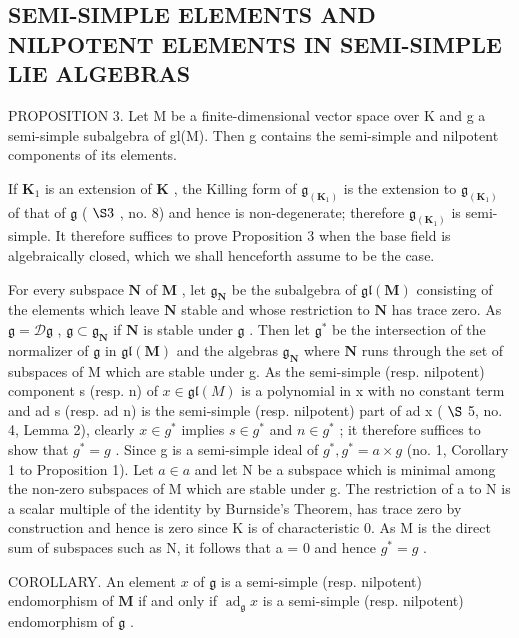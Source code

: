 \subsection{SEMI-SIMPLE ELEMENTS AND NILPOTENT ELEMENTS IN SEMI-SIMPLE LIE ALGEBRAS}

PROPOSITION 3. Let M be a finite-dimensional vector space over K and g a semi-simple subalgebra of gl(M). Then g contains the semi-simple and nilpotent components of its elements.

If \(\mathbf{K}_1\) is an extension of \(\mathbf{K}\) , the Killing form of \(\mathfrak{g}_{(\mathbf{K}_1)}\) is the extension to \(\mathfrak{g}_{(\mathbf{K}_1)}\) of that of \(\mathfrak{g}\) ( \(\S 3\) , no. 8) and hence is non-degenerate; therefore \(\mathfrak{g}_{(\mathbf{K}_1)}\) is semi-simple. It therefore suffices to prove Proposition 3 when the base field is algebraically closed, which we shall henceforth assume to be the case.

For every subspace \(\mathbf{N}\) of \(\mathbf{M}\) , let \(\mathfrak{g}_{\mathbf{N}}\) be the subalgebra of \(\mathfrak{gl}(\mathbf{M})\) consisting of the elements which leave \(\mathbf{N}\) stable and whose restriction to \(\mathbf{N}\) has trace zero. As \(\mathfrak{g} = \mathcal{D}\mathfrak{g}\) , \(\mathfrak{g} \subset \mathfrak{g}_{\mathbf{N}}\) if \(\mathbf{N}\) is stable under \(\mathfrak{g}\) . Then let \(\mathfrak{g}^*\) be the intersection of the normalizer of \(\mathfrak{g}\) in \(\mathfrak{gl}(\mathbf{M})\) and the algebras \(\mathfrak{g}_{\mathbf{N}}\) where \(\mathbf{N}\) runs through the set of subspaces of M which are stable under g. As the semi-simple (resp. nilpotent) component s (resp. n) of \(x \in \mathfrak{gl}(M)\) is a polynomial in x with no constant term and ad s (resp. ad n) is the semi-simple (resp. nilpotent) part of ad x ( \(\S\) 5, no. 4, Lemma 2), clearly \(x \in g^{*}\) implies \(s \in g^{*}\) and \(n \in g^{*}\) ; it therefore suffices to show that \(g^{*} = g\) . Since g is a semi-simple ideal of \(g^{*}, g^{*} = a \times g\) (no. 1, Corollary 1 to Proposition 1). Let \(a \in a\) and let N be a subspace which is minimal among the non-zero subspaces of M which are stable under g. The restriction of a to N is a scalar multiple of the identity by Burnside's Theorem, has trace zero by construction and hence is zero since K is of characteristic 0. As M is the direct sum of subspaces such as N, it follows that a = 0 and hence \(g^{*} = g\) .

COROLLARY. An element \(x\) of \(\mathfrak{g}\) is a semi-simple (resp. nilpotent) endomorphism of \(\mathbf{M}\) if and only if \(\operatorname{ad}_{\mathfrak{g}} x\) is a semi-simple (resp. nilpotent) endomorphism of \(\mathfrak{g}\) .

